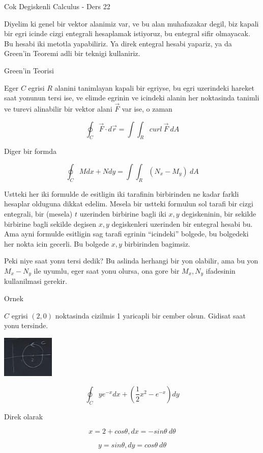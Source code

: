 \documentclass[12pt,fleqn]{article}
\begin{document}
Cok Degiskenli Calculus - Ders 22

Diyelim ki genel bir vektor alanimiz var, ve bu alan muhafazakar degil, biz
kapali bir egri icinde cizgi entegrali hesaplamak istiyoruz, bu entegral
sifir olmayacak. Bu hesabi iki metotla yapabiliriz. Ya direk entegral
hesabi yapariz, ya da Green'in Teoremi adli bir teknigi kullaniriz. 

Green'in Teorisi

Eger $C$ egrisi $R$ alanini tanimlayan kapali bir egriyse, bu egri
uzerindeki hareket saat yonunun tersi ise, ve elimde egrinin ve icindeki
alanin her noktasinda tanimli ve turevi alinabilir bir vektor alani
$\vec{F}$ var ise, o zaman 

\[ \oint_C \vec{F} \cdot d\vec{r} = \int \int_R curl \ \vec{F} \ dA \]

Diger bir formda 

\[ \oint_C M dx + N dy = \int \int_R (N_x - M_y) \ dA \]

Ustteki her iki formulde de esitligin iki tarafinin birbirinden ne kadar
farkli hesaplar olduguna dikkat edelim. Mesela bir ustteki formulun sol
tarafi bir cizgi entegrali, bir (mesela) $t$ uzerinden birbirine bagli iki
$x,y$ degiskeninin, bir sekilde birbirine bagli sekilde degisen $x,y$
degiskenleri uzerinden bir entegral hesabi bu. Ama ayni formulde esitligin
sag tarafi egrinin ``icindeki'' bolgede, bu bolgedeki her nokta icin
gecerli. Bu bolgede $x,y$ birbirinden bagimsiz. 

Peki niye saat yonu tersi dedik? Bu aslinda herhangi bir yon olabilir, ama
bu yon $M_x-N_y$ ile uyumlu, eger saat yonu olursa, ona gore bir $M_x,N_y$
ifadesinin kullanilmasi gerekir. 

Ornek

$C$ egrisi $(2,0)$ noktasinda cizilmis 1 yaricapli bir cember
olsun. Gidisat saat yonu tersinde. 

\includegraphics[height=2cm]{22_1.png}

\[ \oint_C ye^{-x} dx + (\frac{1}{2}x^2 - e^{-x})dy \]

Direk olarak

\[ x = 2 + cos\theta, dx = -sin\theta \ d\theta \]

\[ y = sin\theta, dy = cos\theta \ d\theta \]
\end{document}

